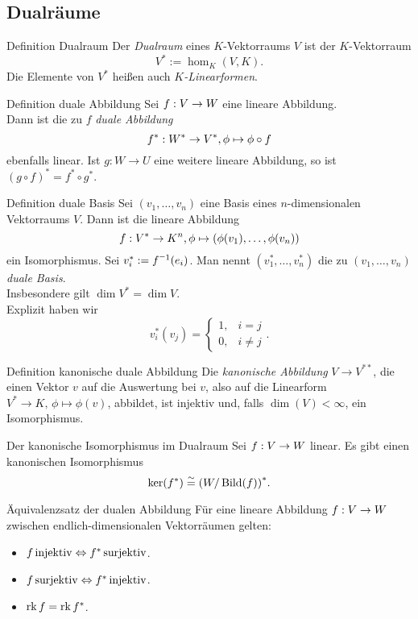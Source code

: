 \documentclass[main.tex]{subfiles}
\begin{document}
\subsection*{Dualräume}
\begin{karte}{Definition Dualraum}
    Der \textit{Dualraum} eines \(K\)-Vektorraums \(V\) ist der 
    \(K\)-Vektorraum 
    \[ V^* := \hom_K(V,K). \]
    Die Elemente von \(V^*\) heißen auch \textit{\(K\)-Linearformen}.
\end{karte}
\begin{karte}{Definition duale Abbildung}
    Sei \( f : V \rightarrow W \) eine lineare Abbildung.\\
    Dann ist die zu \(f\) \textit{duale Abbildung}
    \[ f^* : W^* \rightarrow V^*, \phi \mapsto \phi \circ f \]
    ebenfalls linear.
    Ist \(g: W \rightarrow U\) eine weitere lineare Abbildung,
    so ist \({(g \circ f)}^* = f^* \circ g^* \).    
\end{karte}
\begin{karte}{Definition duale Basis}
    Sei \( (v_1, \ldots, v_n) \) eine Basis eines 
    \(n\)-dimensionalen Vektorraums \(V\). Dann ist 
    die lineare Abbildung 
    \[ f : V^* \rightarrow K^n, 
    \phi \mapsto (\phi(v_1), \ldots, \phi(v_n)) \]
    ein Isomorphismus. Sei \( v_i^* := \inverse{f}(e_i) \). 
    Man nennt \( (v_1^*, \ldots, v_n^*) \) die zu 
    \( (v_1, \ldots, v_n) \) \textit{duale Basis}.\\
    Insbesondere gilt \( \dim V^* = \dim V \).\\
    Explizit haben wir 
    \[ v_i^*(v_j) = \begin{cases}
        1, & i=j \\
        0, & i \neq j
    \end{cases}. \]
\end{karte}
\begin{karte}{Definition kanonische duale Abbildung}
    Die \textit{kanonische Abbildung} \( V \rightarrow V^{**} \),
    die einen Vektor \(v\) auf die Auswertung bei \(v\), also auf die 
    Linearform \( V^* \rightarrow K,\, \phi \mapsto \phi(v)\), abbildet,
    ist injektiv und, falls \(\dim(V) < \infty \), ein Isomorphismus.
\end{karte}
\begin{karte}{Der kanonische Isomorphismus im Dualraum}
    Sei \( f : V \rightarrow W \) linear. Es gibt einen kanonischen 
    Isomorphismus 
    \[ \ker(f^*) \overset{\sim}{=} {(W/\operatorname{Bild}(f))}^*. \]
\end{karte}
\begin{karte}{Äquivalenzsatz der dualen Abbildung}
    Für eine lineare Abbildung \( f : V \rightarrow W \) 
    zwischen endlich-dimensionalen Vektorräumen gelten:
    \begin{itemize}
        \item \( f \operatorname{injektiv} \Leftrightarrow f^* \operatorname{surjektiv} \).
        \item \( f \operatorname{surjektiv} \Leftrightarrow f^* \operatorname{injektiv} \).
        \item \( \operatorname{rk} f = \operatorname{rk} f^* \).
    \end{itemize}
\end{karte}
\end{document}
